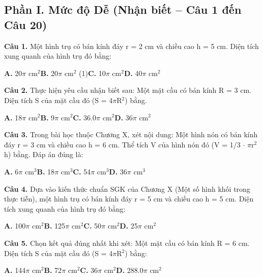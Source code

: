 \documentclass[11pt,a4paper]{article}
\begin{document}
\subsection*{\color{accent} Phần I. Mức độ Dễ (Nhận biết -- Câu 1 đến Câu 20)}
\textbf{\color{primary} Câu 1.} Một hình trụ có bán kính đáy r = 2 cm và chiều cao h = 5 cm. Diện tích xung quanh của hình trụ đó bằng:\par
\hspace*{1.5em}\textbf{A.} 20$\pi$ cm$^2$\quad\quad \textbf{B.} 20$\pi$ cm$^2$ (1)\quad\quad \textbf{C.} 10$\pi$ cm$^2$\quad\quad \textbf{D.} 40$\pi$ cm$^2$\par\vspace{2pt}
\textbf{\color{primary} Câu 2.} Thực hiện yêu cầu nhận biết sau: Một mặt cầu có bán kính R = 3 cm. Diện tích S của mặt cầu đó (S = 4$\pi$R$^2$) bằng.\par
\hspace*{1.5em}\textbf{A.} 18$\pi$ cm$^2$\quad\quad \textbf{B.} 9$\pi$ cm$^2$\quad\quad \textbf{C.} 36.0$\pi$ cm$^2$\quad\quad \textbf{D.} 36$\pi$ cm$^2$\par\vspace{2pt}
\textbf{\color{primary} Câu 3.} Trong bài học thuộc Chương X, xét nội dung: Một hình nón có bán kính đáy r = 3 cm và chiều cao h = 6 cm. Thể tích V của hình nón đó (V = 1/3 $\cdot$ $\pi$r$^2$h) bằng. Đáp án đúng là:\par
\hspace*{1.5em}\textbf{A.} 6$\pi$ cm$^3$\quad\quad \textbf{B.} 18$\pi$ cm$^3$\quad\quad \textbf{C.} 54$\pi$ cm$^3$\quad\quad \textbf{D.} 36$\pi$ cm$^3$\par\vspace{2pt}
\textbf{\color{primary} Câu 4.} Dựa vào kiến thức chuẩn SGK của Chương X (Một số hình khối trong thực tiễn), một hình trụ có bán kính đáy r = 5 cm và chiều cao h = 5 cm. Diện tích xung quanh của hình trụ đó bằng:\par
\hspace*{1.5em}\textbf{A.} 100$\pi$ cm$^2$\quad\quad \textbf{B.} 125$\pi$ cm$^2$\quad\quad \textbf{C.} 50$\pi$ cm$^2$\quad\quad \textbf{D.} 25$\pi$ cm$^2$\par\vspace{2pt}
\textbf{\color{primary} Câu 5.} Chọn kết quả đúng nhất khi xét: Một mặt cầu có bán kính R = 6 cm. Diện tích S của mặt cầu đó (S = 4$\pi$R$^2$) bằng:\par
\hspace*{1.5em}\textbf{A.} 144$\pi$ cm$^2$\quad\quad \textbf{B.} 72$\pi$ cm$^2$\quad\quad \textbf{C.} 36$\pi$ cm$^2$\quad\quad \textbf{D.} 288.0$\pi$ cm$^2$\par\vspace{2pt}
\end{document}
